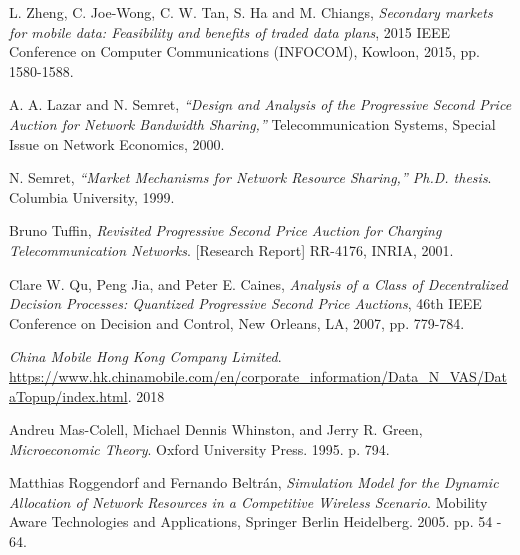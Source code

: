 \documentclass[12pt]{article}
\theoremstyle{definition}
\begin{document}
\begin{thebibliography}{9}

L. Zheng, C. Joe-Wong, C. W. Tan, S. Ha and M. Chiangs, 
\textit{Secondary markets for mobile data: Feasibility and benefits of traded
data plans}, 2015 IEEE
Conference on Computer Communications (INFOCOM), Kowloon, 2015, pp. 1580-1588.

A. A. Lazar and N. Semret, 
\textit{“Design and Analysis of the Progressive Second Price Auction for Network
Bandwidth Sharing,”} Telecommunication Systems, Special Issue on Network Economics, 2000.

N. Semret, 
\textit{“Market Mechanisms for Network Resource Sharing,”
Ph.D. thesis}. 
Columbia University, 1999.

Bruno Tuffin,
\textit{Revisited Progressive Second Price Auction for Charging
Telecommunication Networks}.
[Research Report] RR-4176, INRIA, 2001.

Clare W. Qu, Peng Jia, and Peter E. Caines,
\textit{Analysis of a Class of Decentralized Decision Processes: Quantized
Progressive Second Price Auctions},
46th IEEE Conference on Decision and Control, New Orleans, LA, 2007, pp.
779-784.

\textit{China Mobile Hong Kong Company Limited}.
\url{https://www.hk.chinamobile.com/en/corporate_information/Data_N_VAS/DataTopup/index.html}.
2018

Andreu Mas-Colell, Michael Dennis Whinston, and Jerry R. Green, 
\textit{Microeconomic Theory}. Oxford University Press. 1995. p. 794.

Matthias Roggendorf and Fernando Beltr{\'a}n,
\textit{Simulation Model for the Dynamic Allocation of Network Resources in a Competitive Wireless Scenario}.
Mobility Aware Technologies and Applications, Springer Berlin Heidelberg. 2005.
pp. 54 - 64.

\end{thebibliography}
\end{document}
